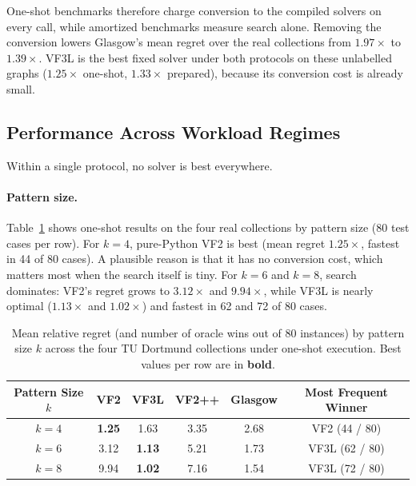\documentclass[11pt,a4paper]{article}
\begin{document}
One-shot benchmarks therefore charge conversion to the compiled solvers on every call, while amortized benchmarks measure search alone. Removing the conversion lowers Glasgow's mean regret over the real collections from $1.97\times$ to $1.39\times$. VF3L is the best fixed solver under both protocols on these unlabelled graphs ($1.25\times$ one-shot, $1.33\times$ prepared), because its conversion cost is already small.

\subsection{Performance Across Workload Regimes}

Within a single protocol, no solver is best everywhere.

\paragraph{Pattern size.} Table~\ref{tab:pattern_size} shows one-shot results on the four real collections by pattern size (80 test cases per row). For $k=4$, pure-Python VF2 is best (mean regret $1.25\times$, fastest in 44 of 80 cases). A plausible reason is that it has no conversion cost, which matters most when the search itself is tiny. For $k=6$ and $k=8$, search dominates: VF2's regret grows to $3.12\times$ and $9.94\times$, while VF3L is nearly optimal ($1.13\times$ and $1.02\times$) and fastest in 62 and 72 of 80 cases.

\begin{table}[t]
\centering
\caption{Mean relative regret (and number of oracle wins out of 80 instances) by pattern size $k$ across the four TU Dortmund collections under one-shot execution. Best values per row are in \textbf{bold}.}
\label{tab:pattern_size}
\small
\begin{tabular}{@{}cccccc@{}}
\toprule
\textbf{Pattern Size $k$} & \textbf{VF2} & \textbf{VF3L} & \textbf{VF2++} & \textbf{Glasgow} & \textbf{Most Frequent Winner} \\
\midrule
$k = 4$ & \textbf{1.25} & 1.63 & 3.35 & 2.68 & VF2 (44 / 80) \\
$k = 6$ & 3.12 & \textbf{1.13} & 5.21 & 1.73 & VF3L (62 / 80) \\
$k = 8$ & 9.94 & \textbf{1.02} & 7.16 & 1.54 & VF3L (72 / 80) \\
\bottomrule
\end{tabular}
\end{table}
\end{document}
